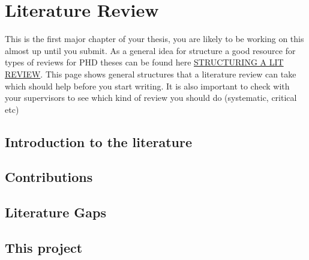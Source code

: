 \documentclass[../main.tex]{subfiles}
\begin{document}
\chapter{Literature Review}
\minitoc \mtcskip 
This is the first major chapter of your thesis, you are likely to be working on this almost up until you submit. As a general idea for structure a good resource for types of reviews for PHD theses can be found here \href{https://www.ncl.ac.uk/academic-skills-kit/assessment/dissertations-and-theses/structuring-a-literature-review/}{STRUCTURING A LIT REVIEW}. This page shows general structures that a literature review can take which should help before you start writing. It is also important to check with your supervisors to see which kind of review you should do (systematic, critical etc)

\section{Introduction to the literature}

\section{Contributions}

\section{Literature Gaps}

\section{This project}
\end{document}
